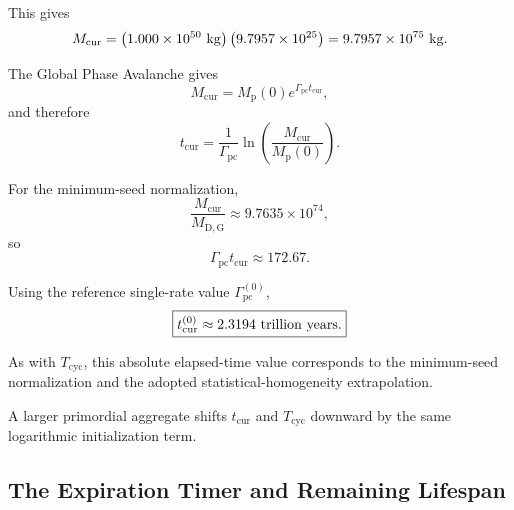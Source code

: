 This gives
\begin{equation}
    M_{\mathrm{cur}}
    =
    \left(
        1.000\times10^{50}
        \ {\rm kg}
    \right)
    \left(
        9.7957\times10^{25}
    \right)
    =
    9.7957\times10^{75}
    \ {\rm kg}.
\end{equation}

The Global Phase Avalanche gives
\begin{equation}
    M_{\mathrm{cur}}
    =
    M_{\mathrm p}(0)
    e^{\Gamma_{\mathrm{pc}}t_{\mathrm{cur}}},
\end{equation}
and therefore
\begin{equation}
    \boxed{
    t_{\mathrm{cur}}
    =
    \frac{
        1
    }{
        \Gamma_{\mathrm{pc}}
    }
    \ln
    \left(
        \frac{
            M_{\mathrm{cur}}
        }{
            M_{\mathrm p}(0)
        }
    \right).
    }
    \label{eq:AU_current_time_general}
\end{equation}

For the minimum-seed normalization,
\begin{equation}
    \frac{
        M_{\mathrm{cur}}
    }{
        M_{\mathrm{D,G}}
    }
    \approx
    9.7635\times10^{74},
\end{equation}
so
\begin{equation}
    \boxed{
    \Gamma_{\mathrm{pc}}
    t_{\mathrm{cur}}
    \approx
    172.67.
    }
    \label{eq:AU_current_efolds}
\end{equation}

Using the reference single-rate value
\(\Gamma_{\mathrm{pc}}^{(0)}\),
\begin{equation}
    \boxed{
    t_{\mathrm{cur}}^{(0)}
    \approx
    2.3194
    \ {\rm trillion\ years}.
    }
    \label{eq:AU_current_time_reference}
\end{equation}

As with
\(T_{\mathrm{cyc}}\),
this absolute elapsed-time value corresponds to the minimum-seed normalization
and the adopted statistical-homogeneity extrapolation.

A larger primordial aggregate shifts
\(t_{\mathrm{cur}}\)
and
\(T_{\mathrm{cyc}}\)
downward by the same logarithmic initialization term.


\subsection{The Expiration Timer and Remaining Lifespan}

